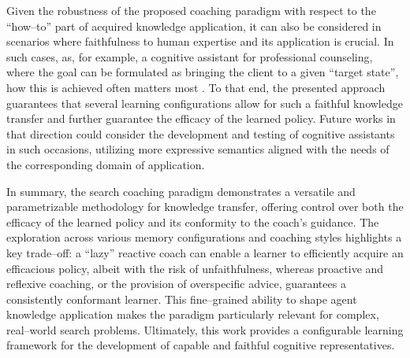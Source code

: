 \documentclass[a4paper,twoside]{article}
\begin{document}
Given the robustness of the proposed coaching paradigm with respect to the ``how--to'' part of acquired knowledge application, it can also be considered in scenarios where faithfulness to human expertise and its application is crucial. In such cases, as, for example, a cognitive assistant for professional counseling, where the goal can be formulated as bringing the client to a given ``target state'', how this is achieved often matters most \cite{sedlakova2023}. To that end, the presented approach guarantees that several learning configurations allow for such a faithful knowledge transfer and further guarantee the efficacy of the learned policy. Future works in that direction could consider the development and testing of cognitive assistants in such occasions, utilizing more expressive semantics aligned with the needs of the corresponding domain of application.

In summary, the search coaching paradigm demonstrates a versatile and parametrizable methodology for knowledge transfer, offering control over both the efficacy of the learned policy and its conformity to the coach's guidance. The exploration across various memory configurations and coaching styles highlights a key trade--off: a ``lazy'' reactive coach can enable a learner to efficiently acquire an efficacious policy, albeit with the risk of unfaithfulness, whereas proactive and reflexive coaching, or the provision of overspecific advice, guarantees a consistently conformant learner. This fine--grained ability to shape agent knowledge application makes the paradigm particularly relevant for complex, real--world search problems. Ultimately, this work provides a configurable learning framework for the development of capable and faithful cognitive representatives.
%
%
%

{\small
}
\end{document}
